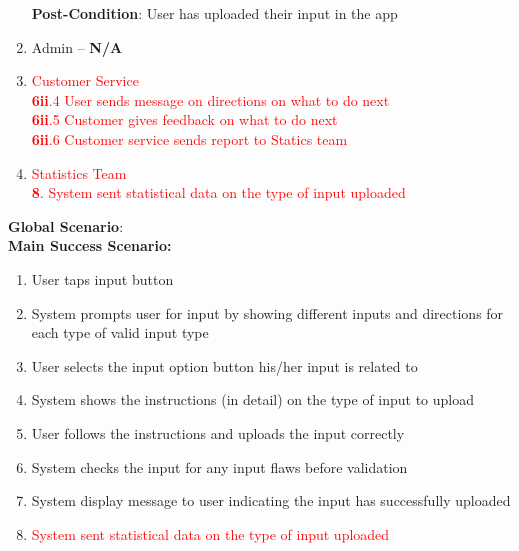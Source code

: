 \begin{enumerate}[{\bf VP1.}]
		\textbf{Post-Condition}: User has uploaded their input in the app
		\item Admin – \textbf{N/A}
		\item \textcolor{red}{Customer Service}\\
			\textcolor{red}{\textbf{6ii}.4 User sends message on directions on what to do next}\\
			\textcolor{red}{\textbf{6ii}.5 Customer gives feedback on what to do next}\\
			\textcolor{red}{\textbf{6ii}.6 Customer service sends report to Statics team}\\
		\item \textcolor{red}{Statistics Team}\\
			\textcolor{red}{\textbf{8}. System sent statistical data on the type of input uploaded}\\

	\end{enumerate}
	\textbf{Global Scenario}:
	\\ \textbf{Main Success Scenario:}
	\begin{enumerate}[{\bf 1.}]
		\item User taps input button 
		\item System prompts user for input by showing different inputs and directions for each type of valid input type
		\item User selects the input option button his/her input is  related to
		\item System shows the instructions (in detail) on the type of input to upload
		\item User follows the instructions and uploads the input correctly
		\item System checks the input for any input flaws before validation
		\item System display message to user indicating the input has successfully uploaded
		\item \textcolor{red}{System sent statistical data on the type of input uploaded}\\

	\end{enumerate}

